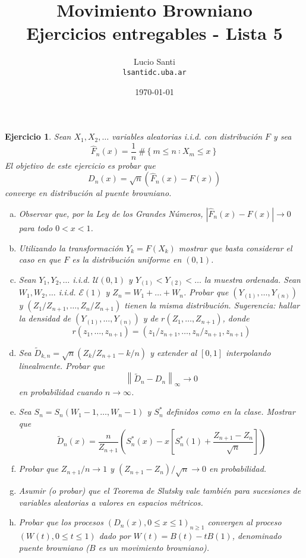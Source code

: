 \documentclass[a4paper,11pt]{article}
\title{Movimiento Browniano\\
      \small{Ejercicios entregables - Lista 5}}
\author{Lucio Santi\\
        \texttt{lsanti\at dc.uba.ar}}
\date{\today}
\newcommand{\abs}[1]{\ensuremath{\left\lvert #1 \right\rvert}}
\newcommand{\norm}[1]{\left\lVert#1\right\rVert}
\newcommand{\normi}[1]{\norm{#1}_{\infty}}
\newcommand{\Sst}[1]{S_n^{*}(#1)}
\newtheorem*{ej}{Ejercicio}
\begin{document}
\maketitle

\begin{ej} 
Sean $X_1, X_2, \dots$ variables aleatorias i.i.d. con distribución $F$ y sea
$$\hat{F}_n(x) = \frac{1}{n} ~\#\left\{m \leq n ∶  X_m \leq x \right\}$$
El objetivo de este ejercicio es probar que
$$D_n(x) = \sqrt{n} (\hat{F}_n(x) − F(x))$$
converge en distribución al \textsl{puente browniano}.

\begin{enumerate}[a.]
    \item Observar que, por la Ley de los Grandes Números,
    $\abs{\hat{F}_n(x) − F (x)} \to 0$ para todo $0 < x < 1$.

    \item Utilizando la transformación $Y_k = F(X_k)$ mostrar que basta
    considerar el caso en que $F$ es la distribución uniforme en $(0, 1)$.

    \item Sean $Y_1, Y_2, \dots$ i.i.d. $\mathcal{U}(0, 1)$ y
    $Y_{(1)} < Y_{(2)} < \dots$ la muestra ordenada. Sean
    $W_1, W_2, \dots$ i.i.d. $\mathcal{E}(1)$ y
    $Z_n = W_1 + \dots + W_n$. Probar que
    $(Y_{(1)}, \dots, Y_{(n)})$ y $(Z_1/Z_{n+1}, \dots, Z_n/Z_{n+1})$
    tienen la misma distribución. Sugerencia: hallar la densidad de
    $(Y_{(1)}, \dots, Y_{(n)})$ y de $r(Z_1, \dots, Z_{n+1})$, donde
    $$r(z_1, \dots, z_{n+1}) = (z_1/z_{n+1}, \dots, z_n/z_{n+1}, z_{n+1})$$

    \item Sea $\tilde{D}_{k,n} = \sqrt{n} (Z_k/Z_{n+1} − k/n)$ y extender al
    $[0, 1]$ interpolando linealmente. Probar que
    $$\normi{\tilde{D}_n - D_n} \to 0$$
    en probabilidad cuando $n \to \infty$.

    \item Sea $S_n = S_n(W_1 − 1, \dots, W_n − 1)$ y $S_n^{*}$ definidos como
    en la clase. Mostrar que
    $$\tilde{D}_n(x) = \frac{n}{Z_{n+1}} \left(\Sst{x} - x \left[ \Sst{1} + \frac{Z_{n+1} - Z_n}{\sqrt{n}} \right] \right)$$

    \item Probar que $Z_{n+1}/n \to 1$ y 
    $(Z_{n+1} - Z_n)/\sqrt{n} \to 0$
    en probabilidad.

    \item Asumir (o probar) que el Teorema de Slutsky vale también para
    sucesiones de variables aleatorias a valores en espacios métricos.

    \item Probar que los procesos $(D_n(x), 0 \leq x \leq 1)_{n \geq 1}$
    convergen al proceso $(W(t), 0 \leq t \leq 1)$ dado por
    $W(t) = B(t) − tB(1)$,
    denominado \textsl{puente browniano} ($B$ es un movimiento browniano).
\end{enumerate}
\end{ej}
\end{document}
